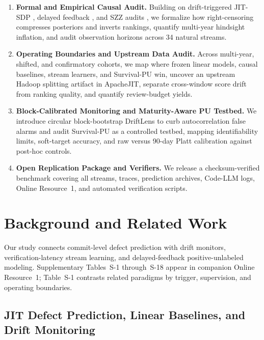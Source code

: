 \documentclass[pdflatex,sn-basic]{sn-jnl}
\theoremstyle{definition}
\theoremstyle{plain}
\begin{document}
\begin{enumerate}[leftmargin=1.7em,itemsep=0.02em,topsep=0.20em]
  \item \textbf{Formal and Empirical Causal Audit.} Building on drift-triggered JIT-SDP \citep{pote2026adaptive}, delayed feedback \citep{chapelle2014modeling}, and SZZ audits \citep{song2023waiting,bludau2026quantifying}, we formalize how right-censoring compresses posteriors and inverts rankings, quantify multi-year hindsight inflation, and audit observation horizons across 34 natural streams.
  \item \textbf{Operating Boundaries and Upstream Data Audit.} Across multi-year, shifted, and confirmatory cohorts, we map where frozen linear models, causal baselines, stream learners, and Survival-PU win, uncover an upstream Hadoop splitting artifact in ApacheJIT, separate cross-window score drift from ranking quality, and quantify review-budget yields.
  \item \textbf{Block-Calibrated Monitoring and Maturity-Aware PU Testbed.} We introduce circular block-bootstrap DriftLens to curb autocorrelation false alarms and audit Survival-PU as a controlled testbed, mapping identifiability limits, soft-target accuracy, and raw versus 90-day Platt calibration against post-hoc controls.
  \item \textbf{Open Replication Package and Verifiers.} We release a checksum-verified benchmark covering all streams, traces, prediction archives, Code-LLM logs, Online Resource~1, and automated verification scripts.
\end{enumerate}

\section{Background and Related Work}
\label{sec:related}

Our study connects commit-level defect prediction with drift monitors, verification-latency stream learning, and delayed-feedback positive-unlabeled modeling. Supplementary Tables~S-1 through~S-18 appear in companion Online Resource~1; Table~S-1 contrasts related paradigms by trigger, supervision, and operating boundaries.

\subsection{JIT Defect Prediction, Linear Baselines, and Drift Monitoring}
\label{sec:rel_jitsdp}
\end{document}
